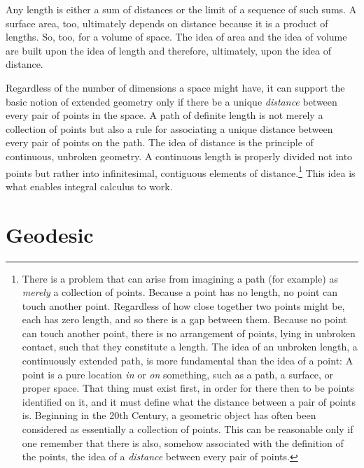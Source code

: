 Any length is either a sum of distances or the limit of a sequence of such
sums. A surface area, too, ultimately depends on distance because it is a
product of lengths.  So, too, for a volume of space.  The idea of area and the
idea of volume are built upon the idea of length and therefore, ultimately,
upon the idea of distance.

Regardless of the number of dimensions a space might have, it can support the
basic notion of extended geometry only if there be a unique \emph{distance}
between every pair of points in the space.  A path of definite length is not
merely a collection of points but also a rule for associating a unique distance
between every pair of points on the path.  The idea of distance is the
principle of continuous, unbroken geometry.  A continuous length is properly
divided not into points but rather into infinitesimal, contiguous elements of
distance.\footnote{%
   There is a problem that can arise from imagining a path (for example) as
   \emph{merely} a collection of points.  Because a point has no length, no
   point can touch another point.  Regardless of how close together two points
   might be, each has zero length, and so there is a gap between them.  Because
   no point can touch another point, there is no arrangement of points, lying
   in unbroken contact, such that they constitute a length.  The idea of an
   unbroken length, a continuously extended path, is more fundamental than the
   idea of a point:  A point is a pure location \emph{in} or \emph{on}
   something, such as a path, a surface, or proper space.  That thing must
   exist first, in order for there then to be points identified on it, and it
   must define what the distance between a pair of points is.  Beginning in the
   20th Century, a geometric object has often been considered as essentially a
   collection of points.  This can be reasonable only if one remember that
   there is also, somehow associated with the definition of the points, the
   idea of a \emph{distance} between every pair of points.%
}
This idea is what enables integral calculus to work.

\section{Geodesic}

